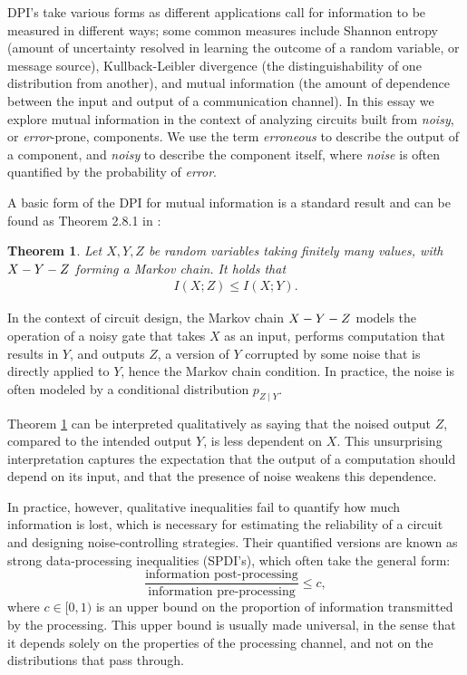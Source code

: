 \documentclass[12pt,reqno]{amsart}
\theoremstyle{plain} %
\newtheorem{theorem}{Theorem}[section]
\theoremstyle{remark}
\theoremstyle{definition}
\begin{document}
DPI's take various forms as different applications call for information to be measured in different ways; some common measures include Shannon entropy (amount of uncertainty resolved in learning the outcome of a random variable, or message source), Kullback-Leibler divergence (the distinguishability of one distribution from another), and mutual information (the amount of dependence between the input and output of a communication channel). In this essay we explore mutual information in the context of analyzing circuits built from \textit{noisy}, or \textit{error}-prone, components. We use the term \textit{erroneous} to describe the output of a component, and \textit{noisy} to describe the component itself, where \textit{noise} is often quantified by the probability of \textit{error}.

A basic form of the DPI for mutual information is a standard result and can be found as Theorem 2.8.1 in \cite{TC}:
\begin{theorem}\label{thm: dpi}
    Let $X, Y, Z$ be random variables taking finitely many values, with $X\--Y\--Z$ forming a Markov chain. It holds that
    \begin{align}
        I(X;Z)\le I(X;Y).
    \end{align}
\end{theorem}

In the context of circuit design, the Markov chain $X\--Y\--Z$ models the operation of a noisy gate that takes $X$ as an input, performs computation that results in $Y$, and outputs $Z$, a version of $Y$ corrupted by some noise that is directly applied to $Y$, hence the Markov chain condition. In practice, the noise is often modeled by a conditional distribution $p_{Z\mid Y}$.

Theorem \ref{thm: dpi} can be interpreted qualitatively as saying that the noised output $Z$, compared to the intended output $Y$, is less dependent on $X$. This unsurprising interpretation captures the expectation that the output of a computation should depend on its input, and that the presence of noise weakens this dependence. 

In practice, however, qualitative inequalities fail to quantify how much information is lost, which is necessary for estimating the reliability of a circuit and designing noise-controlling strategies. Their quantified versions are known as strong data-processing inequalities (SPDI's), which often take the general form:
\[\frac{\text{information post-processing}}{\text{information pre-processing}}\le c,\]
where $c\in[0,1)$ is an upper bound on the proportion of information transmitted by the processing. This upper bound is usually made universal, in the sense that it depends solely on the properties of the processing channel, and not on the distributions that pass through.
\end{document}
